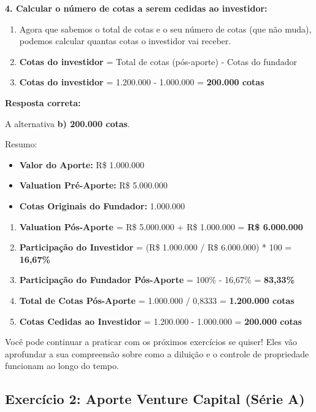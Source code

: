 \documentclass[
]{book}
\begin{document}
\textbf{4. Calcular o número de cotas a serem cedidas ao investidor:}

\begin{enumerate}
\def\labelenumi{\Roman{enumi}.}
\item
  Agora que sabemos o total de cotas e o seu número de cotas (que não muda), podemos calcular quantas cotas o investidor vai receber.
\item
  \textbf{Cotas do investidor} = Total de cotas (pós-aporte) - Cotas do fundador
\item
  \textbf{Cotas do investidor} = 1.200.000 - 1.000.000 = \textbf{200.000 cotas}
\end{enumerate}

\textbf{Resposta correta:}

A alternativa \textbf{b) 200.000 cotas}.

Resumo:

\begin{itemize}
\item
  \textbf{Valor do Aporte:} R\$ 1.000.000
\item
  \textbf{Valuation Pré-Aporte:} R\$ 5.000.000
\item
  \textbf{Cotas Originais do Fundador:} 1.000.000
\end{itemize}

\begin{enumerate}
\def\labelenumi{\arabic{enumi}.}
\item
  \textbf{Valuation Pós-Aporte} = R\$ 5.000.000 + R\$ 1.000.000 = \textbf{R\$ 6.000.000}
\item
  \textbf{Participação do Investidor} = (R\$ 1.000.000 / R\$ 6.000.000) * 100 = \textbf{16,67\%}
\item
  \textbf{Participação do Fundador Pós-Aporte} = 100\% - 16,67\% = \textbf{83,33\%}
\item
  \textbf{Total de Cotas Pós-Aporte} = 1.000.000 / 0,8333 = \textbf{1.200.000 cotas}
\item
  \textbf{Cotas Cedidas ao Investidor} = 1.200.000 - 1.000.000 = \textbf{200.000 cotas}
\end{enumerate}

Você pode continuar a praticar com os próximos exercícios se quiser! Eles vão aprofundar a sua compreensão sobre como a diluição e o controle de propriedade funcionam ao longo do tempo.

\subsection{\texorpdfstring{\textbf{Exercício 2: Aporte Venture Capital (Série A)}}{Exercício 2: Aporte Venture Capital (Série A)}}\label{exercuxedcio-2-aporte-venture-capital-suxe9rie-a}
\end{document}
